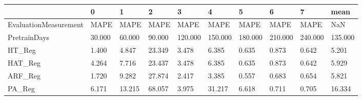 \begin{tabular}{llllllllll}
\toprule
{} &      0 &      1 &      2 &       3 &       4 &       5 &       6 &       7 &    mean \\
\midrule
EvaluationMeasurement &   MAPE &   MAPE &   MAPE &    MAPE &    MAPE &    MAPE &    MAPE &    MAPE &     NaN \\
PretrainDays          & 30.000 & 60.000 & 90.000 & 120.000 & 150.000 & 180.000 & 210.000 & 240.000 & 135.000 \\
HT\_Reg                &  1.400 &  4.847 & 23.349 &   3.478 &   6.385 &   0.635 &   0.873 &   0.642 &   5.201 \\
HAT\_Reg               &  4.264 &  7.716 & 23.437 &   3.478 &   6.385 &   0.635 &   0.873 &   0.642 &   5.929 \\
ARF\_Reg               &  1.720 &  9.282 & 27.874 &   2.417 &   3.385 &   0.557 &   0.683 &   0.654 &   5.821 \\
PA\_Reg                &  6.171 & 13.215 & 68.057 &   3.975 &  31.217 &   6.618 &   0.711 &   0.705 &  16.334 \\
\bottomrule
\end{tabular}
